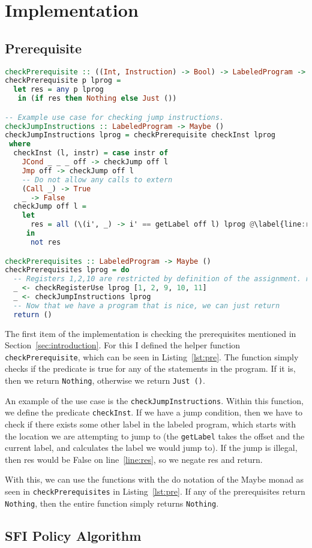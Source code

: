 \section{Implementation}
\subsection{Prerequisite}
\begin{lstlisting}[language={haskell}, caption={Cheking prerequisites}, label={lst:pre}, escapechar=@]
checkPrerequisite :: ((Int, Instruction) -> Bool) -> LabeledProgram -> Maybe ()
checkPrerequisite p lprog =
  let res = any p lprog
   in (if res then Nothing else Just ())

-- Example use case for checking jump instructions.
checkJumpInstructions :: LabeledProgram -> Maybe ()
checkJumpInstructions lprog = checkPrerequisite checkInst lprog
 where
  checkInst (l, instr) = case instr of
    JCond _ _ _ off -> checkJump off l
    Jmp off -> checkJump off l
    -- Do not allow any calls to extern
    (Call _) -> True
    _ -> False
  checkJump off l =
    let
      res = all (\(i', _) -> i' == getLabel off l) lprog @\label{line:res}@
     in
      not res

checkPrerequisites :: LabeledProgram -> Maybe ()
checkPrerequisites lprog = do
  -- Registers 1,2,10 are restricted by definition of the assignment. register 9, 11 is used for guards
  _ <- checkRegisterUse lprog [1, 2, 9, 10, 11]
  _ <- checkJumpInstructions lprog
  -- Now that we have a program that is nice, we can just return
  return ()
\end{lstlisting}

The first item of the implementation is checking the prerequisites mentioned in
Section~\ref{sec:introduction}. For this I defined the helper function
\texttt{checkPrerequisite}, which can be seen in Listing~\ref{lst:pre}. The
function simply checks if the predicate is true for any of the statements in
the program. If it is, then we return \texttt{Nothing}, otherwise we return \texttt{Just ()}.

An example of the use case is the \texttt{checkJumpInstructions}. Within this
function, we define the predicate \texttt{checkInst}. If we have a jump
condition, then we have to check if there exists some other label in the
labeled program, which starts with the location we are attempting to jump to
(the \texttt{getLabel} takes the offset and the current label, and calculates
the label we would jump to). If the jump is illegal, then res would be False on
line~\ref{line:res}, so we negate res and return.

With this, we can use the functions with the do notation of the Maybe monad as
seen in \texttt{checkPrerequisites} in Listing~\ref{lst:pre}. If any of the
prerequisites return \texttt{Nothing}, then the entire function simply returns
\texttt{Nothing}.

\subsection{SFI Policy Algorithm}

